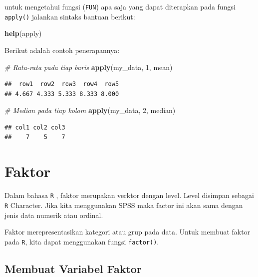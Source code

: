 \documentclass[]{book}
\newenvironment{Shaded}{\begin{snugshade}}{\end{snugshade}}
\newcommand{\KeywordTok}[1]{\textcolor[rgb]{0.13,0.29,0.53}{\textbf{#1}}}
\newcommand{\DecValTok}[1]{\textcolor[rgb]{0.00,0.00,0.81}{#1}}
\newcommand{\CommentTok}[1]{\textcolor[rgb]{0.56,0.35,0.01}{\textit{#1}}}
\newcommand{\NormalTok}[1]{#1}
\begin{document}
untuk mengetahui fungsi (\texttt{FUN}) apa saja yang dapat diterapkan
pada fungsi \texttt{apply()} jalankan sintaks bantuan berikut:

\begin{Shaded}
\begin{Highlighting}[]
\KeywordTok{help}\NormalTok{(apply)}
\end{Highlighting}
\end{Shaded}

Berikut adalah contoh penerapannya:

\begin{Shaded}
\begin{Highlighting}[]
\CommentTok{# Rata-rata pada tiap baris}
\KeywordTok{apply}\NormalTok{(my_data, }\DecValTok{1}\NormalTok{, mean)}
\end{Highlighting}
\end{Shaded}

\begin{verbatim}
##  row1  row2  row3  row4  row5 
## 4.667 4.333 5.333 8.333 8.000
\end{verbatim}

\begin{Shaded}
\begin{Highlighting}[]
\CommentTok{# Median pada tiap kolom}
\KeywordTok{apply}\NormalTok{(my_data, }\DecValTok{2}\NormalTok{, median)}
\end{Highlighting}
\end{Shaded}

\begin{verbatim}
## col1 col2 col3 
##    7    5    7
\end{verbatim}

\section{Faktor}\label{faktor}

Dalam bahasa \texttt{R} , faktor merupakan verktor dengan level. Level
disimpan sebagai \texttt{R} Character. Jika kita menggunakan SPSS maka
factor ini akan sama dengan jenis data numerik atau ordinal.

Faktor merepresentasikan kategori atau grup pada data. Untuk membuat
faktor pada \texttt{R}, kita dapat menggunakan fungsi \texttt{factor()}.

\subsection{Membuat Variabel Faktor}\label{membuat-variabel-faktor}
\end{document}
